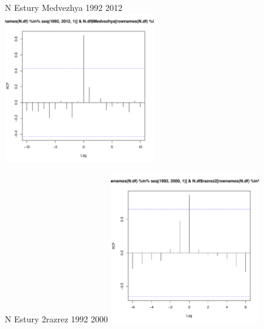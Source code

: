 \documentclass[12pt, a4paper]{disser}
\begin{document}
\begin{figure}[ht]
	\begin{minipage}[b]{.46\linewidth}
	\begin{center}
	{\tiny N Estury Medvezhya 1992 2012}
	\includegraphics[width=65mm]{../White_Sea/dynamic_N_N1/crosscorr_N_Estury_Medvezhya_1992_2012.pdf}
	\end{center}
	\end{minipage}
%
	\hfil %
%
	\begin{minipage}[b]{.46\linewidth}
	\begin{center}	
	{\tiny  N Estury 2razrez 1992 2000}
	\includegraphics[width=65mm]{../White_Sea/dynamic_N_N1/crosscorr_N_Estury_2razrez_1992_2000.pdf}
	\end{center}
	\end{minipage}



\end{figure}
\end{document}
